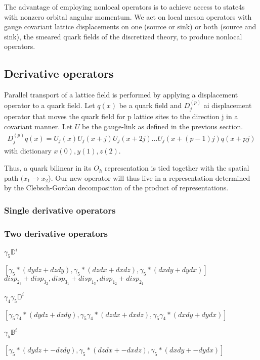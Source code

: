 \begin{table}
\begin{itemize}
\end{itemize}
The advantage of employing nonlocal operators is to achieve access to state4s with nonzero orbital angular momentum. We act on local meson operators with gauge covariant lattice displacements on one (source or sink) or both (source and sink), the smeared quark fields of the discretized theory, to produce nonlocal operators. 

\subsection{Derivative operators}
Parallel transport of a lattice field is performed by applying a displacement operator to a quark field.  Let $q(x)$ be a quark field and $D_j^{(p)}$ ai displacement operator that moves the quark field for p lattice sites to the direction j in a covariant manner. Let $U$ be the gauge-link as defined in the previous section.
\begin{align}
    D_j^{(p)} q(x) = U_j(x) U_j(x+j) U_j(x+2j)...U_j(x+(p-1)j) q(x+pj)
\end{align}
with dictionary $x(0), y(1), z(2)$.

Thus, a quark bilinear in its $O_h$ representation is tied together with the spatial path $(x_1 \to x_2$). Our new operator will thus live in a representation determined by the Clebsch-Gordan decomposition of the product of representations. 

\subsubsection{Single derivative operators}

\subsubsection{Two derivative operators}

$\gamma_5\mathbb{D}^i$

$[\gamma_5 * (dydz + dzdy), \gamma_5 * (dzdx + dxdz), \gamma_5 * (dxdy + dydx)]$
$disp_{2_3}+ disp_{3_2}, disp_{3_1} + disp_{1_3}, disp_{1_2} + disp_{2_1}$

$\gamma_4\gamma_5\mathbb{D}^i$

$[\gamma_5\gamma_4 * (dydz + dzdy), \gamma_5\gamma_4 * (dzdx + dxdz), \gamma_5\gamma_4 * (dxdy + dydx)]$

$\gamma_5\mathbb{B}^i$

$[\gamma_5 * (dydz + -dzdy), \gamma_5 * (dzdx + -dxdz), \gamma_5 * (dxdy + -dydx)]$


\end{table}
